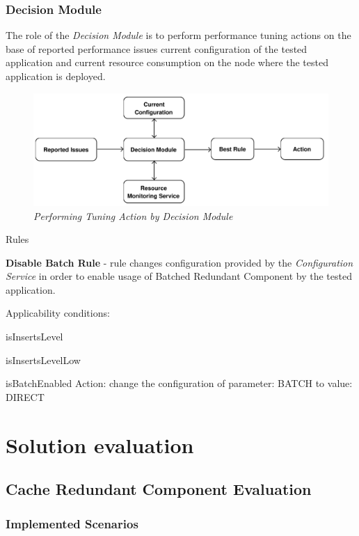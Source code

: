 \documentclass[10pt,a4paper]{article}
\let\tempone\itemize
\let\temptwo\enditemize
\renewenvironment{itemize}{\tempone\addtolength{\itemsep}{-0.4\baselineskip}}{\temptwo}
\begin{document}
\subsubsection{Decision Module} \label{dm}

The role of the \textit{Decision Module} is to perform performance tuning actions on the base of reported performance issues current configuration of the tested application and current resource consumption on the node where the tested application is deployed. 

\begin{figure}[!htb]
\centering
\includegraphics[width=1\textwidth]{DecisionModuleDiagram}
\caption{\textit{Performing Tuning Action by Decision Module}} \label{issue}
\end{figure}

Rules

\noindent\textbf{Disable Batch Rule} - rule changes configuration provided by the \textit{Configuration Service} in order to enable usage of Batched Redundant Component by the tested application. 

\noindent Applicability conditions: 

\begin{itemize}
\item isInsertsLevel   
\item  isInsertsLevelLow  
\item  isBatchEnabled 
\end{itemize}
\noindent Action: change the configuration of parameter: BATCH to value: DIRECT 


\section{Solution evaluation} 
\subsection{Cache Redundant Component Evaluation}
\subsubsection{Implemented Scenarios} 
\end{document}
